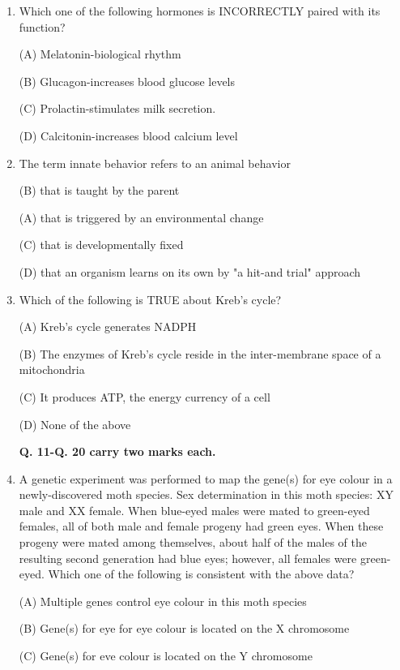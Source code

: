\documentclass[journal]{IEEEtran}
\begin{document}
\begin{enumerate}
{(A) Feathers or fur

(C) Shivering

(B) Fat layers in the adipose tissue

(D) Vasodilation
}
\item{ Which one of the following hormones is INCORRECTLY paired with its function?

(A) Melatonin-biological rhythm

(B) Glucagon-increases blood glucose levels

(C) Prolactin-stimulates milk secretion.

(D) Calcitonin-increases blood calcium level
}
\item{ The term innate behavior refers to an animal behavior

(B) that is taught by the parent

(A) that is triggered by an environmental change

(C) that is developmentally fixed

(D) that an organism learns on its own by "a hit-and trial" approach
}
\item{ Which of the following is TRUE about Kreb's cycle?

(A) Kreb's cycle generates NADPH

(B) The enzymes of Kreb's cycle reside in the inter-membrane space of a mitochondria

(C) It produces ATP, the energy currency of a cell

(D) None of the above
}
\begin{center}
\textbf{Q. 11-Q. 20 carry two marks each.}
\end{center}
\item{ A genetic experiment was performed to map the gene(s) for eye colour in a newly-discovered moth species. Sex determination in this moth species: XY male and XX female. When blue-eyed males were mated to green-eyed females, all of both male and female progeny had green eyes. When these progeny were mated among themselves, about half of the males of the resulting second generation had blue eyes; however, all females were green-eyed. Which one of the following is consistent with the above data?

(A) Multiple genes control eye colour in this moth species

(B) Gene(s) for eye for eye colour is located on the X chromosome

(C) Gene(s) for eve colour is located on the Y chromosome

}
\end{enumerate}
\end{document}
